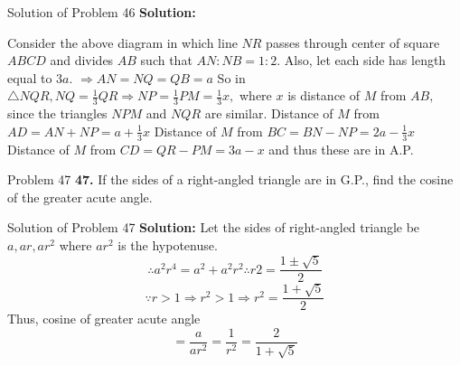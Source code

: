 \documentclass[aspectratio=1610,8pt]{beamer}
\begin{document}
\begin{frame}{Solution of Problem 46}
  \textbf{Solution:}
  \begin{center}
  \end{center}
  Consider the above diagram in which line $NR$ passes through center of square $ABCD$ and divides $AB$ such that $AN: NB = 1:2.$
  Also, let each side has length equal to $3a.$
  \linebreak\linebreak
  $\Rightarrow AN = NQ = QB = a$ So in $\triangle NQR, NQ = \frac{1}{3}QR \Rightarrow NP = \frac{1}{3}PM = \frac{1}{3}x,$ where $x$
  is distance of $M$ from $AB,$ since the triangles $NPM$ and $NQR$ are similar.
  \linebreak\linebreak
  Distance of $M$ from $AD = AN + NP = a + \frac{1}{3}x$
  \linebreak\linebreak
  Distance of $M$ from $BC = BN - NP = 2a - \frac{1}{3}x$
  \linebreak\linebreak
  Distance of $M$ from $CD = QR - PM = 3a - x$ and thus these are in A.P.
\end{frame}
\begin{frame}{Problem 47}
  \textbf{47.} If the sides of a right-angled triangle are in G.P., find the cosine of the greater acute angle.
\end{frame}
\begin{frame}{Solution of Problem 47}
  \textbf{Solution:} Let the sides of right-angled triangle be $a, ar, ar^2$ where $ar^2$ is the hypotenuse.
  $$\therefore a^2r^4 = a^2 + a^2r^2 \therefore r2 = \frac{1 \pm \sqrt{5}}{2}$$
  $$\because r> 1 \Rightarrow r^2> 1 \Rightarrow r^2 = \frac{1 + \sqrt{5}}{2}$$
  Thus, cosine of greater acute angle $$= \frac{a}{ar^2} = \frac{1}{r^2} = \frac{2}{1 + \sqrt{5}}$$
\end{frame}
\end{document}
